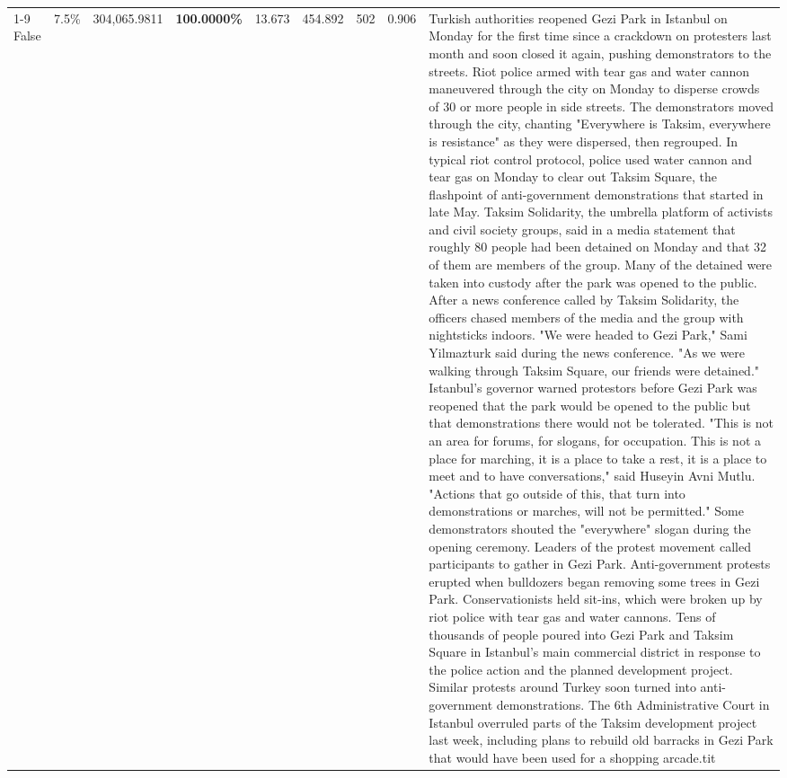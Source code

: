 \begin{table}[H]
\begin{tabular}{lllrlllll}
\cline{1-9}
False & 7.5\% & 304,065.9811 & \bfseries \color{red} 100.0000\% & 13.673 & 454.892 & 502 & 0.906 & Turkish authorities reopened Gezi Park in Istanbul on Monday for the first time since a crackdown on protesters last month and soon closed it again, pushing demonstrators to the streets. Riot police armed with tear gas and water cannon maneuvered through the city on Monday to disperse crowds of 30 or more people in side streets. The demonstrators moved through the city, chanting "Everywhere is Taksim, everywhere is resistance" as they were dispersed, then regrouped. In typical riot control protocol, police used water cannon and tear gas on Monday to clear out Taksim Square, the flashpoint of anti-government demonstrations that started in late May. Taksim Solidarity, the umbrella platform of activists and civil society groups, said in a media statement that roughly 80 people had been detained on Monday and that 32 of them are members of the group. Many of the detained were taken into custody after the park was opened to the public. After a news conference called by Taksim Solidarity, the officers chased members of the media and the group with nightsticks indoors. "We were headed to Gezi Park," Sami Yilmazturk said during the news conference. "As we were walking through Taksim Square, our friends were detained." Istanbul's governor warned protestors before Gezi Park was reopened that the park would be opened to the public but that demonstrations there would not be tolerated. "This is not an area for forums, for slogans, for occupation. This is not a place for marching, it is a place to take a rest, it is a place to meet and to have conversations," said Huseyin Avni Mutlu. "Actions that go outside of this, that turn into demonstrations or marches, will not be permitted." Some demonstrators shouted the "everywhere" slogan during the opening ceremony. Leaders of the protest movement called participants to gather in Gezi Park. Anti-government protests erupted when bulldozers began removing some trees in Gezi Park. Conservationists held sit-ins, which were broken up by riot police with tear gas and water cannons. Tens of thousands of people poured into Gezi Park and Taksim Square in Istanbul's main commercial district in response to the police action and the planned development project. Similar protests around Turkey soon turned into anti-government demonstrations. The 6th Administrative Court in Istanbul overruled parts of the Taksim development project last week, including plans to rebuild old barracks in Gezi Park that would have been used for a shopping arcade.tit \\

\end{tabular}
\end{table}
